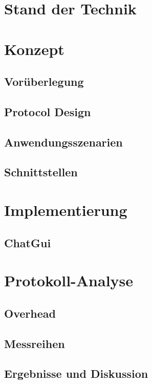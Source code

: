 \documentclass[
    11pt, %
    DIV=11,
    ngerman, %
    a4paper, %
    oneside, %
    titlepage, %
    parskip=half, %
    headings=normal, %
    listof=totoc, %
    bibliography=totoc, %
    bibliographyWebverzeichnis=totoc,
    index=totoc, %
    captions=tableheading, %
    final %
]{scrreprt}
\begin{document}
\chapter{Stand der Technik}
  
  
\chapter{Konzept}
	
	\section{Vorüberlegung}
		
	\newpage
	\section{Protocol Design}
		
	\section{Anwendungsszenarien}
		
	\section{Schnittstellen}
		
	
\chapter{Implementierung}
	
	\section{ChatGui}
	
	
\chapter{Protokoll-Analyse}	
	
	\section{Overhead}
		
	\section{Messreihen}
		
	\section{Ergebnisse und Diskussion}
		
	
\end{document}
